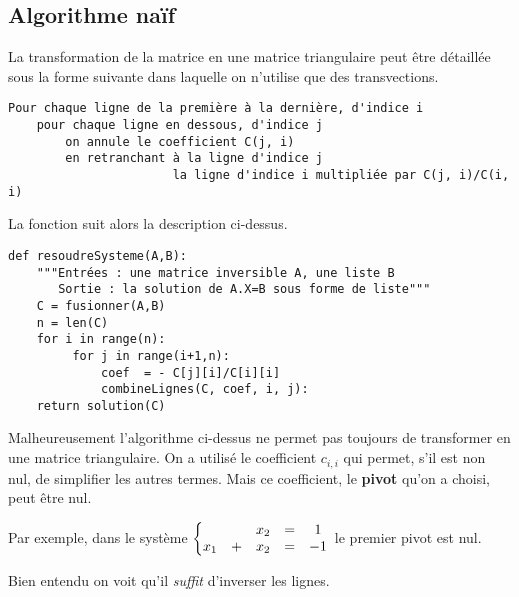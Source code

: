 \subsection{Algorithme naïf}
La transformation de la matrice en une matrice triangulaire peut être détaillée sous la forme suivante dans laquelle on n'utilise que des transvections.
\begin{lstlisting}
Pour chaque ligne de la première à la dernière, d'indice i
    pour chaque ligne en dessous, d'indice j
        on annule le coefficient C(j, i)
        en retranchant à la ligne d'indice j
                       la ligne d'indice i multipliée par C(j, i)/C(i, i)
\end{lstlisting}
La fonction suit alors la description ci-dessus.

\newpage
\begin{lstlisting}
def resoudreSysteme(A,B):
    """Entrées : une matrice inversible A, une liste B
       Sortie : la solution de A.X=B sous forme de liste"""
    C = fusionner(A,B)
    n = len(C)
    for i in range(n): 
         for j in range(i+1,n):
             coef  = - C[j][i]/C[i][i]
             combineLignes(C, coef, i, j):
    return solution(C)
\end{lstlisting}
Malheureusement l'algorithme ci-dessus ne permet pas toujours de transformer en une matrice triangulaire. On a utilisé le coefficient $c_{i, i}$ qui permet, s'il est non nul, de simplifier les autres termes. Mais ce coefficient, le {\bf pivot} qu'on a choisi, peut être nul.

Par exemple, dans le système  $\left\{
\begin{matrix}\hfill  &&x_2&=&1\\
x_1&+&x_2&=&-1\\
\end{matrix}\right.$ le premier pivot est nul.

Bien entendu on voit qu'il {\em suffit} d'inverser les lignes.
